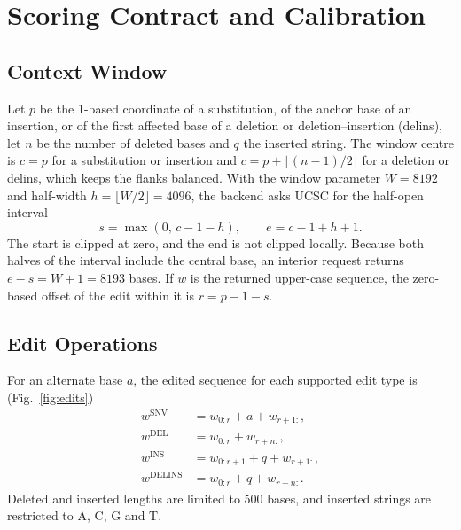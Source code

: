 \documentclass[10pt,journal,a4paper]{IEEEtran}
\begin{document}
\section{Scoring Contract and Calibration}
\label{sec:contract}

\subsection{Context Window}
Let $p$ be the 1-based coordinate of a substitution, of the anchor base of an insertion, or of the first affected base of a deletion or deletion--insertion (delins), let $n$ be the number of deleted bases and $q$ the inserted string. The window centre is $c=p$ for a substitution or insertion and $c=p+\lfloor(n-1)/2\rfloor$ for a deletion or delins, which keeps the flanks balanced. With the window parameter $W=8192$ and half-width $h=\lfloor W/2\rfloor=4096$, the backend asks UCSC for the half-open interval
\begin{equation}
s=\max(0,\,c-1-h), \qquad e=c-1+h+1.
\label{eq:window}
\end{equation}
The start is clipped at zero, and the end is not clipped locally. Because both halves of the interval include the central base, an interior request returns $e-s=W+1=8193$ bases. If $w$ is the returned upper-case sequence, the zero-based offset of the edit within it is $r=p-1-s$.

\subsection{Edit Operations}
For an alternate base $a$, the edited sequence for each supported edit type is (Fig.~\ref{fig:edits})
\begin{align}
w^{\mathrm{SNV}} &= w_{0:r} + a + w_{r+1:}, \label{eq:snv}\\
w^{\mathrm{DEL}} &= w_{0:r} + w_{r+n:}, \label{eq:del}\\
w^{\mathrm{INS}} &= w_{0:r+1} + q + w_{r+1:}, \label{eq:ins}\\
w^{\mathrm{DELINS}} &= w_{0:r} + q + w_{r+n:}. \label{eq:delins}
\end{align}
Deleted and inserted lengths are limited to 500 bases, and inserted strings are restricted to A, C, G and T.
\end{document}
